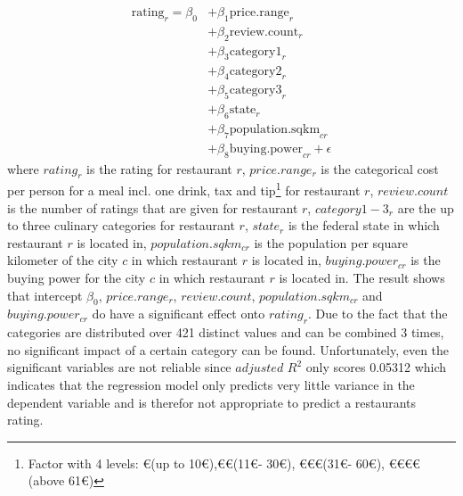 \begin{equation}
	\begin{aligned}
	\mathrm{rating}_{r} = \beta_{0} 
	&+ \beta_{1}  \mathrm{price.range}_{r} \\
	&+ \beta_{2}  \mathrm{review.count}_{r} \\
	&+ \beta_{3}  \mathrm{category1}_{r}    \\
	&+ \beta_{4}  \mathrm{category2}_{r} \\
	&+ \beta_{5}  \mathrm{category3}_{r} \\
	&+ \beta_{6}  \mathrm{state}_{r}   \\
	&+ \beta_{7}  \mathrm{population.sqkm}_{cr}  \\
	&+ \beta_{8}  \mathrm{buying.power}_{cr} + \epsilon
	\end{aligned}
	\label{eq:rating_regression}
\end{equation}
where $rating_r$ is the rating for restaurant $r$, $price.range_r$ is the categorical cost per person for a meal incl. one drink, tax and tip\footnote{Factor with 4 levels: \euro (up to 10\euro),\euro\euro (11\euro - 30\euro), \euro\euro\euro (31\euro - 60\euro), \euro\euro\euro\euro (above 61\euro) } for restaurant $r$, $review.count$ is the number of ratings that are given for restaurant $r$, $category1-3_r$ are the up to three culinary categories for restaurant $r$, $state_r$ is the federal state in which restaurant $r$ is located in, $population.sqkm_{cr}$ is the population per square kilometer of the city $c$ in which restaurant $r$ is located in, $buying.power_{cr}$ is the buying power for the city $c$ in which restaurant $r$ is located in. \newline
The result shows that  intercept $\beta_{0}$, $price.range_r$, $review.count$, $population.sqkm_{cr}$ and 
$buying.power_{cr}$ do have a significant effect onto $rating_r$. Due to the fact that the categories are distributed over 421 distinct values and can be combined 3 times, no significant impact of a certain category can be found. Unfortunately, even the significant variables are not reliable since $adjusted$ $ R^2$ only scores 0.05312 which indicates that the regression model only predicts very little variance in the dependent variable and is therefor not appropriate to predict a restaurants rating.



